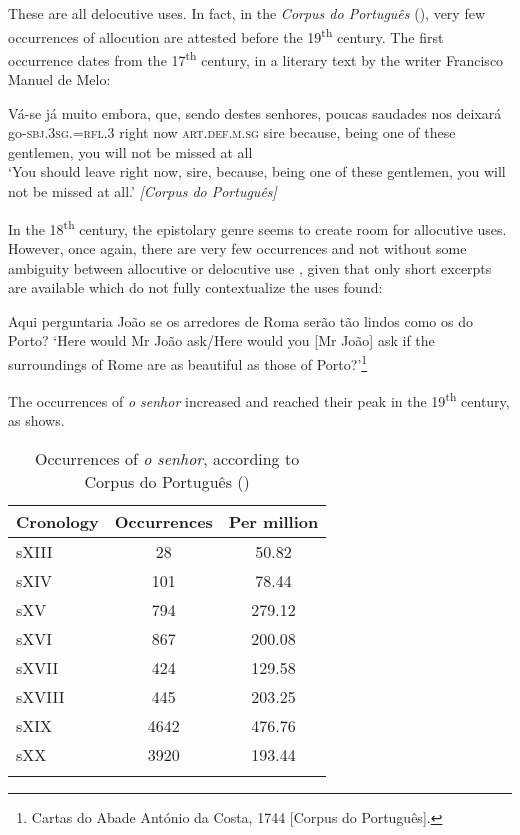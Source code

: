 \documentclass[output=paper]{langscibook}
\begin{document}
These are all delocutive uses. In fact, in the \textit{Corpus do Português} (\citealt{DaviesFerreira2016}), very few occurrences of allocution are attested before the 19\textsuperscript{th} century. The first occurrence  dates from the 17\textsuperscript{th} century, in a literary text by the writer Francisco Manuel de Melo: 

\ea\label{ex:marques:12}
\gll Vá-se        já                        {muito embora, que},  sendo destes senhores,        {poucas saudades nos deixará}\\
{go-}\textsc{sbj.3sg.}=\textsc{rfl.3}   {right now}  \textsc{art.def.m.sg}    sire     because,           being {one of these} gentlemen,       {you will not be missed at all}\\
\glt ‘You should leave right now, sire, because, being one of these gentlemen, you will not be missed at all.’ \emph{[Corpus do Português]}
\z 

In the 18\textsuperscript{th} century, the epistolary genre seems to create room for allocutive uses. However, once again, there are very few occurrences and not without some ambiguity between allocutive or delocutive use , given that only short excerpts are available which do not fully contextualize the uses found:


\ea\label{ex:marques:13}
{Aqui perguntaria {} João se os arredores de Roma serão tão lindos como os do Porto? }
\glt ‘Here would Mr João ask\slash Here would you [Mr João] ask if the surroundings of Rome are as beautiful as those of Porto?’\footnote{{Cartas do Abade António da Costa}, 1744 [Corpus do Português].}
\z 


The occurrences of \textit{o senhor} increased and reached their peak in the 19\textsuperscript{th} century, as   shows. 


\begin{table}
\begin{tabular}{l S[table-format=4.0] S[table-format=3.2]}
\lsptoprule
Cronology  &   {Occurrences} &  {Per million}\\\midrule
 {sXIII}   &   28       &   50.82 \\
 {sXIV}    &  101       &   78.44 \\
 {sXV}     & 794        &   279.12\\ 
 {sXVI}    &  867       &   200.08\\ 
 {sXVII}   &   424      &   129.58\\ 
 {sXVIII}  &    445     &   203.25\\ 
 {sXIX}    &  4642      &   476.76\\ 
 {sXX}     &  3920      &   193.44\\
\lspbottomrule
\end{tabular}
\caption{Occurrences of \textit{o senhor}, according to Corpus do Português (\citealt{DaviesFerreira2016})\label{tab:marques:3}}
\end{table}
\end{document}
